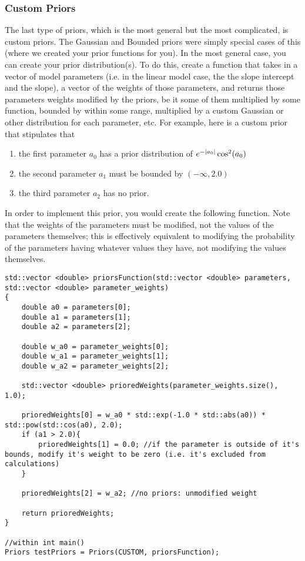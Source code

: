 \documentclass[12pt]{article}
\begin{document}
\subsubsection{Custom Priors}
\par The last type of priors, which is the most general but the most complicated, is custom priors. The Gaussian and Bounded priors were simply special cases of this (where we created your prior functions for you). In the most general case, you can create your prior distribution(s). To do this, create a function that takes in a vector of model parameters (i.e. in the linear model case, the the slope intercept and the slope), a vector of the weights of those parameters, and returns those parameters weights modified by the priors, be it some of them multiplied by some function, bounded by within some range, multiplied by a custom Gaussian or other distribution for each parameter, etc. For example, here is a custom prior that stipulates that
\begin{enumerate}
	\item the first parameter $a_0$ has a prior distribution of $e^{-\abs{a_0}}\cos^2(a_0)$ 
	\item the second parameter $a_1$ must be bounded by $(-\infty,2.0)$
	\item the third parameter $a_2$ has no prior.
\end{enumerate}
In order to implement this prior, you would create the following function. Note that the weights of the parameters must be modified, not the values of the parameters themselves; this is effectively equivalent to modifying the probability of the parameters having whatever values they have, not modifying the values themselves.
\begin{lstlisting}
std::vector <double> priorsFunction(std::vector <double> parameters, std::vector <double> parameter_weights)
{
	double a0 = parameters[0];
	double a1 = parameters[1];
	double a2 = parameters[2];

	double w_a0 = parameter_weights[0];
	double w_a1 = parameter_weights[1];
	double w_a2 = parameter_weights[2];

	std::vector <double> prioredWeights(parameter_weights.size(), 1.0);
	
	prioredWeights[0] = w_a0 * std::exp(-1.0 * std::abs(a0)) * std::pow(std::cos(a0), 2.0);
	if (a1 > 2.0){
		prioredWeights[1] = 0.0; //if the parameter is outside of it's bounds, modify it's weight to be zero (i.e. it's excluded from calculations)
	}
	
	prioredWeights[2] = w_a2; //no priors: unmodified weight
	
	return prioredWeights;
}

//within int main()
Priors testPriors = Priors(CUSTOM, priorsFunction);
\end{lstlisting}
\end{document}
